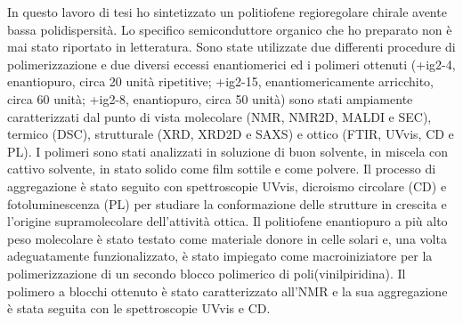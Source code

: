 \documentclass[a4paper,12pt,openright]{book}
\begin{document}
\noindent
In questo lavoro di tesi ho sintetizzato un poli\-tiofene regio\-regolare chirale avente bassa poli\-dispersità. Lo specifico semiconduttore organico che ho preparato non è mai stato riportato in letteratura. Sono state utilizzate due differenti procedure di polimerizzazione e due diversi eccessi enantiomerici ed i polimeri ottenuti (\cmpd+{ig2-4}, enantiopuro, circa 20 unità ripetitive; \cmpd+{ig2-15}, enantiomericamente arricchito, circa 60 unità; \cmpd+{ig2-8}, enantiopuro, circa 50 unità) sono stati ampiamente caratterizzati dal punto di vista molecolare (\acrshort{NMR}, \acrshort{NMR2D}, \acrshort{MALDI} e \acrshort{SEC}), termico (\acrshort{DSC}), strutturale (\acrshort{XRD}, \acrshort{XRD2D} e \acrshort{SAXS}) e ottico (\acrshort{FTIR}, \acrshort{UVvis}, \acrshort{CD} e \acrshort{PL}). I polimeri sono stati analizzati in soluzione di buon solvente, in miscela con cattivo solvente, in stato solido come film sottile e come polvere. 
Il processo di aggregazione è stato seguito con spettroscopie \acrshort{UVvis}, dicroismo circolare (\acrshort{CD}) e fotoluminescenza (\acrshort{PL}) per studiare la conformazione delle strutture in crescita e l'origine supramolecolare dell'attività ottica. 
Il politiofene enantiopuro %
a più alto peso molecolare è stato testato come materiale donore in celle solari e, una volta adeguatamente funzionalizzato, è stato impiegato come macroiniziatore per la polimerizzazione di un secondo blocco polimerico di poli\-(vinil\-piridina). Il polimero a blocchi ottenuto è stato caratterizzato all'\acrshort{NMR} e la sua aggregazione è stata seguita con le spettroscopie \acrshort{UVvis} e \acrshort{CD}.

\restoregeometry

\end{document}
